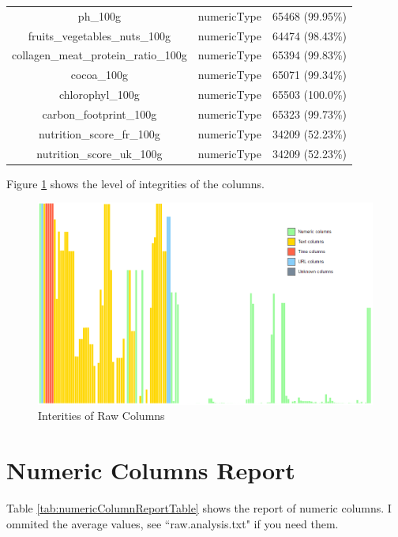 \documentclass[11pt]{article}
\begin{document}
\begin{center}
\begin{longtable}{|c|c|r|}
ph\_100g& numericType& 65468 (99.95\%)\\
fruits\_vegetables\_nuts\_100g& numericType& 64474 (98.43\%)\\
collagen\_meat\_protein\_ratio\_100g& numericType& 65394 (99.83\%)\\
cocoa\_100g& numericType& 65071 (99.34\%)\\
chlorophyl\_100g& numericType& 65503 (100.0\%)\\
carbon\_footprint\_100g& numericType& 65323 (99.73\%)\\
nutrition\_score\_fr\_100g& numericType& 34209 (52.23\%)\\
nutrition\_score\_uk\_100g& numericType& 34209 (52.23\%)\\


\hline

\end{longtable}
\end{center}

Figure \ref{fig:columnReportFigure} shows the level of integrities of the columns.

\begin{figure}[!htp]
\centering
\includegraphics[width=\textwidth]{../vis/integrities.of.raw.columns.png}
\caption{Interities of Raw Columns}
\label{fig:columnReportFigure}
\end{figure}

\section{Numeric Columns Report}

Table \ref{tab:numericColumnReportTable} shows the report of numeric columns. I ommited the average values, see ``raw.analysis.txt" if you need them.
\end{document}

